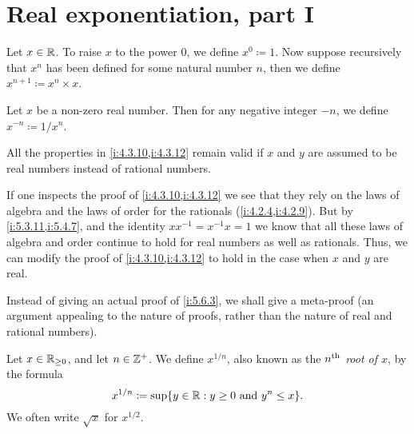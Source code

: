 \section{Real exponentiation, part I}\label{i:sec:5.6}

\begin{defn}\label{i:5.6.1}
  Let \(x \in \mathbb{R}\).
  To raise \(x\) to the power \(0\), we define \(x^0 \coloneqq 1\).
  Now suppose recursively that \(x^n\) has been defined for some natural number \(n\), then we define \(x^{n + 1} \coloneqq x^n \times x\).
\end{defn}

\begin{defn}\label{i:5.6.2}
  Let \(x\) be a non-zero real number.
  Then for any negative integer \(-n\), we define \(x^{-n} \coloneqq 1 / x^n\).
\end{defn}

\begin{prop}\label{i:5.6.3}
  All the properties in \cref{i:4.3.10,i:4.3.12} remain valid if \(x\) and \(y\) are assumed to be real numbers instead of rational numbers.
\end{prop}

\begin{meta-proof}[\pf{i:5.6.3}]
If one inspects the proof of \cref{i:4.3.10,i:4.3.12} we see that they rely on the laws of algebra and the laws of order for the rationals (\cref{i:4.2.4,i:4.2.9}).
But by \cref{i:5.3.11,i:5.4.7}, and the identity \(xx^{-1} = x^{-1} x = 1\) we know that all these laws of algebra and order continue to hold for real numbers as well as rationals.
Thus, we can modify the proof of \cref{i:4.3.10,i:4.3.12} to hold in the case when \(x\) and \(y\) are real.
\end{meta-proof}

\begin{note}
  Instead of giving an actual proof of \cref{i:5.6.3}, we shall give a meta-proof
  (an argument appealing to the nature of proofs, rather than the nature of real and rational numbers).
\end{note}

\begin{defn}\label{i:5.6.4}
  Let \(x \in \mathbb{R}_{\geq 0}\), and let \(n \in \mathbb{Z}^+\).
  We define \(x^{1 / n}\), also known as the \emph{\(n^{\operatorname{th}}\) root of \(x\)}, by the formula
  \[
    x^{1 / n} \coloneqq \sup\set{y \in \R : y \geq 0 \text{ and } y^n \leq x}.
  \]
  We often write \(\sqrt{x}\) for \(x^{1 / 2}\).
\end{defn}

